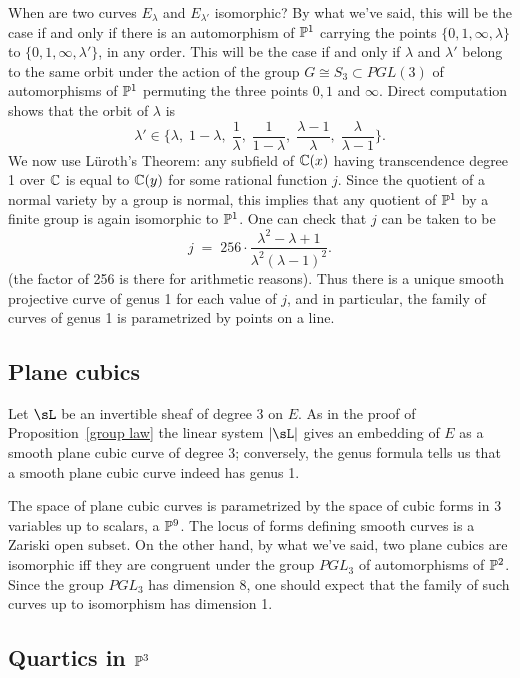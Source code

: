 When are two curves $E_\lambda$ and $E_{\lambda'}$ isomorphic? By what we've said, this will be the case if and only if there is an automorphism of $\PP^1$ carrying the points $\{0,1,\infty,\lambda\}$ to $\{0,1,\infty,\lambda'\}$, in any order. This will be the case if and only if $\lambda$ and $\lambda'$ belong to the same orbit under the action of the group $G \cong S_3 \subset PGL(3)$ of automorphisms of $\PP^1$ permuting the three points $0, 1$ and $\infty$. Direct computation shows that the orbit of $\lambda$ is
$$
\lambda' \in \{\lambda, \; 1-\lambda, \; \frac{1}{\lambda},\;  \frac{1}{1-\lambda}, \; \frac{\lambda - 1}{\lambda}, \; \frac{\lambda}{\lambda - 1} \}.
$$
We now use L\"uroth's Theorem: any subfield of $\CC(x)$ having transcendence degree 1 over $\CC$ is equal to $\CC(y)$ for some rational function $j$.
Since the quotient of a normal variety by a group is normal, this implies that any quotient of $\PP^1$ by a finite group is again isomorphic to $\PP^1$.
One can check that $j$ can be taken to be
$$
j \; = \; 256\cdot \frac{\lambda^2 - \lambda + 1}{\lambda^2(\lambda - 1)^2}.
$$
(the factor of 256 is there for arithmetic reasons). Thus there is a unique smooth projective curve of genus 1 for each value of $j$, and in particular, the family of
curves of genus 1 is parametrized by points on a line.

\subsection{Plane cubics}

Let $\sL$ be an invertible sheaf of degree 3 on $E$. As in the proof of Proposition~\ref{group law} the linear system $|\sL|$ gives an embedding of $E$ as a smooth plane cubic curve of degree 3; conversely, the genus formula tells us that a smooth plane cubic curve indeed has genus 1. 

The space of plane cubic curves is parametrized by the space of cubic forms in 3 variables up to 
scalars, a  $\PP^9$. The locus of forms defining smooth curves is a Zariski open subset. On the other hand, by what we've said, two plane cubics are isomorphic iff they are congruent under the group $PGL_3$ of automorphisms of $\PP^2$. Since the group $PGL_3$ has dimension 8, one should expect that the family of such curves up to isomorphism has dimension 1.



\subsection{Quartics in $\PP^3$} 

